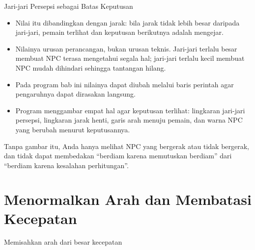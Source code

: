 \documentclass[aspectratio=169,10pt]{beamer}
\begin{document}
\begin{frame}{Jari-jari Persepsi sebagai Batas Keputusan}
\begin{itemize}
  \item Nilai itu dibandingkan dengan jarak: bila jarak tidak lebih besar
        daripada jari-jari, pemain terlihat dan keputusan berikutnya adalah
        mengejar.
  \item Nilainya urusan perancangan, bukan urusan teknis. Jari-jari terlalu
        besar membuat NPC terasa mengetahui segala hal; jari-jari terlalu kecil
        membuat NPC mudah dihindari sehingga tantangan hilang.
  \item Pada program bab ini nilainya dapat diubah melalui baris perintah agar
        pengaruhnya dapat dirasakan langsung.
  \item Program menggambar empat hal agar keputusan terlihat: lingkaran
        jari-jari persepsi, lingkaran jarak henti, garis arah menuju pemain,
        dan warna NPC yang berubah menurut keputusannya.
\end{itemize}
\vspace{0.12cm}
\begin{kotak}
Tanpa gambar itu, Anda hanya melihat NPC yang bergerak atau tidak bergerak,
dan tidak dapat membedakan ``berdiam karena memutuskan berdiam'' dari
``berdiam karena kesalahan perhitungan''.
\end{kotak}
\end{frame}

\section{Menormalkan Arah dan Membatasi Kecepatan}
  {Memisahkan arah dari besar kecepatan}
\end{document}
